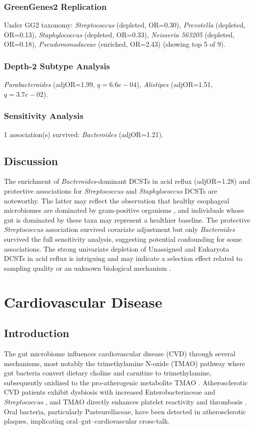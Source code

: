 \documentclass[11pt,a4paper]{article}
\begin{document}
\subsubsection{GreenGenes2 Replication}
Under GG2 taxonomy: \textit{Streptococcus} (depleted, OR=0.30), \textit{Prevotella} (depleted, OR=0.13), \textit{Staphylococcus} (depleted, OR=0.33), \textit{Neisseria 563205} (depleted, OR=0.18), \textit{Pseudomonadaceae} (enriched, OR=2.43) (showing top 5 of 9).

\subsubsection{Depth-2 Subtype Analysis}
\textit{Parabacteroides} (adjOR=1.99, $q=6.6e-04$), \textit{Alistipes} (adjOR=1.51, $q=3.7e-02$).

\subsubsection{Sensitivity Analysis}
1 association(s) survived: \textit{Bacteroides} (adjOR=1.21).

\subsection{Discussion}
The enrichment of \textit{Bacteroides}-dominant DCSTs in acid reflux (adjOR=1.28) and protective associations for \textit{Streptococcus} and \textit{Staphylococcus} DCSTs are noteworthy. The latter may reflect the observation that healthy esophageal microbiomes are dominated by gram-positive organisms \cite{Deshpande2018_esophageal}, and individuals whose gut is dominated by these taxa may represent a healthier baseline. The protective \textit{Streptococcus} association survived covariate adjustment but only \textit{Bacteroides} survived the full sensitivity analysis, suggesting potential confounding for some associations. The strong univariate depletion of Unassigned and Eukaryota DCSTs in acid reflux is intriguing and may indicate a selection effect related to sampling quality or an unknown biological mechanism \cite{DeSouza2021_GERD}.
\newpage

\section{Cardiovascular Disease}
\subsection{Introduction}
The gut microbiome influences cardiovascular disease (CVD) through several mechanisms, most notably the trimethylamine N-oxide (TMAO) pathway where gut bacteria convert dietary choline and carnitine to trimethylamine, subsequently oxidized to the pro-atherogenic metabolite TMAO \cite{Wang2011_TMAO,Tang2013_TMAO}. Atherosclerotic CVD patients exhibit dysbiosis with increased Enterobacteriaceae and \textit{Streptococcus} \cite{Jie2017_ASCVD}, and TMAO directly enhances platelet reactivity and thrombosis \cite{Zhu2016_TMAO_thrombosis}. Oral bacteria, particularly Pasteurellaceae, have been detected in atherosclerotic plaques, implicating oral--gut--cardiovascular cross-talk.
\end{document}
